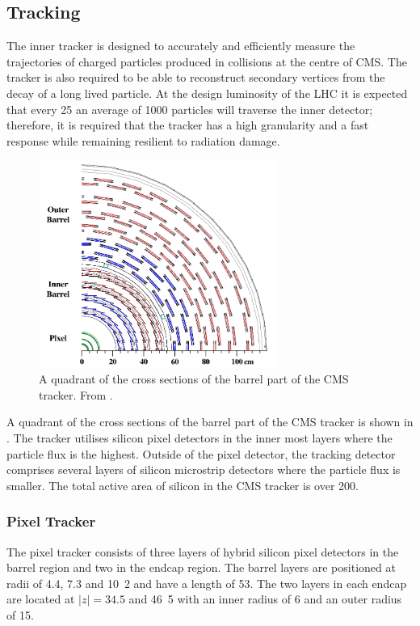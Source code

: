 \subsection{Tracking}
The inner tracker is designed to accurately and efficiently measure the
trajectories of charged particles produced in collisions at the centre of CMS.
The tracker is also required to be able to reconstruct secondary vertices from
the decay of a long lived particle.  At the design luminosity of the LHC it
is expected that every \unit{25}{\ns} an average of 1000 particles will traverse
the inner detector; therefore, it is required that the tracker has a high
granularity and a fast response while remaining resilient to radiation damage. 

\begin{figure}[htbp]
  \centering
  \includegraphics[width=0.7\textwidth]{tracker}
  \caption{A quadrant of the cross sections of the barrel part of the {CMS}
tracker. From \cite{cmsgsf}.}
  \label{fig:tracker}
\end{figure}

A quadrant of the cross sections of the barrel part of the {CMS}
tracker is shown in .
The tracker utilises silicon pixel detectors in the inner most layers where the
particle flux is the highest.  Outside of the pixel detector, the tracking
detector comprises several layers of silicon microstrip detectors where the
particle flux is smaller.  The total active area of silicon in the CMS tracker
is over \unit{200}{\meter\squared}.\cite{chatrchyan2008cms}

\subsubsection{Pixel Tracker}
The pixel tracker consists of three layers of hybrid silicon pixel detectors in
the barrel region and two in the endcap region. 
The barrel layers are positioned at radii of 4.4, 7.3 and \unit{10.2}{\cm} and have
a length of \unit{53}{\cm}. The two layers in each endcap are located at
$|z|=34.5$ and \unit{46.5}{\cm} with an inner radius of \unit{6}{\cm} and an
outer radius of \unit{15}{\cm}.

